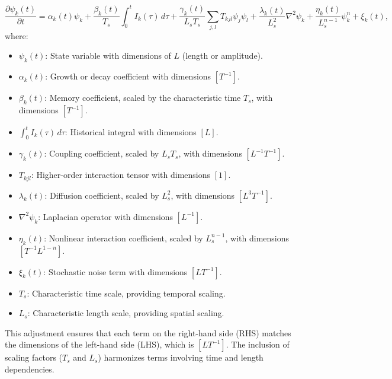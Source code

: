 \documentclass{article}
\theoremstyle{plain}
\begin{document}
\begin{itemize}
\begin{equation}
\frac{\partial \psi_k(t)}{\partial t} = \alpha_k(t) \psi_k + \frac{\beta_k(t)}{T_s} \int_0^t I_k(\tau) \, d\tau + \frac{\gamma_k(t)}{L_s T_s} \sum_{j,l} T_{kjl} \psi_j \psi_l + \frac{\lambda_k(t)}{L_s^2} \nabla^2 \psi_k + \frac{\eta_k(t)}{L_s^{n-1}} \psi_k^n + \xi_k(t),
\end{equation}
where:
\begin{itemize}
    \item \(\psi_k(t)\): State variable with dimensions of \(L\) (length or amplitude).
    \item \(\alpha_k(t)\): Growth or decay coefficient with dimensions \([T^{-1}]\).
    \item \(\beta_k(t)\): Memory coefficient, scaled by the characteristic time \(T_s\), with dimensions \([T^{-1}]\).
    \item \(\int_0^t I_k(\tau) \, d\tau\): Historical integral with dimensions \([L]\).
    \item \(\gamma_k(t)\): Coupling coefficient, scaled by \(L_s T_s\), with dimensions \([L^{-1} T^{-1}]\).
    \item \(T_{kjl}\): Higher-order interaction tensor with dimensions \([1]\).
    \item \(\lambda_k(t)\): Diffusion coefficient, scaled by \(L_s^2\), with dimensions \([L^3 T^{-1}]\).
    \item \(\nabla^2 \psi_k\): Laplacian operator with dimensions \([L^{-1}]\).
    \item \(\eta_k(t)\): Nonlinear interaction coefficient, scaled by \(L_s^{n-1}\), with dimensions \([T^{-1} L^{1-n}]\).
    \item \(\xi_k(t)\): Stochastic noise term with dimensions \([L T^{-1}]\).
    \item \(T_s\): Characteristic time scale, providing temporal scaling.
    \item \(L_s\): Characteristic length scale, providing spatial scaling.
\end{itemize}

This adjustment ensures that each term on the right-hand side (RHS) matches the dimensions of the left-hand side (LHS), which is \([L T^{-1}]\). The inclusion of scaling factors (\(T_s\) and \(L_s\)) harmonizes terms involving time and length dependencies.


\end{itemize}
\end{document}
